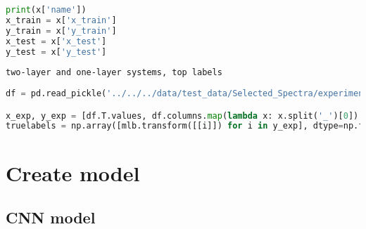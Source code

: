 \begin{lstlisting}[language=Python]
print(x['name'])
x_train = x['x_train']
y_train = x['y_train']
x_test = x['x_test']
y_test = x['y_test']
\end{lstlisting}

\begin{lstlisting}
two-layer and one-layer systems, top labels
\end{lstlisting}

\begin{lstlisting}[language=Python]
df = pd.read_pickle('../../../data/test_data/Selected_Spectra/experimental_data_elemental.pkl')

x_exp, y_exp = [df.T.values, df.columns.map(lambda x: x.split('_')[0]).values] # top layer
truelabels = np.array([mlb.transform([[i]]) for i in y_exp], dtype=np.float32)
\end{lstlisting}

\hypertarget{create-model}{%
\section{Create model}\label{create-model}}

\hypertarget{cnn-model}{%
\subsection{CNN model}\label{cnn-model}}

